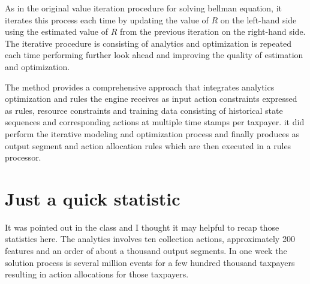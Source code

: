 \documentclass[a4paper,12pt]{article}
\begin{document}
As in the original value iteration procedure for solving bellman equation, it iterates this process each time by updating the value of $R$ on the left-hand side using the estimated value of $R$ from the previous iteration on the right-hand side. The iterative procedure is consisting of analytics and optimization is repeated each time performing further look ahead and improving the quality of estimation and optimization. 


The method provides a comprehensive approach that integrates analytics optimization and rules the engine receives as input action constraints expressed as rules, resource constraints and training data consisting of historical state sequences and corresponding actions at multiple time stamps per taxpayer. it did perform the iterative modeling and optimization process and finally produces as output segment and action allocation rules which are then executed in a rules processor. 

\section{Just a quick statistic}
It was pointed out in the class and I thought it may helpful to recap those statistics here. The analytics involves ten collection actions, approximately 200 features and an order of about a thousand output segments. In one week the solution process is several million events for a few hundred thousand taxpayers resulting in action allocations for those taxpayers.




\end{document}
